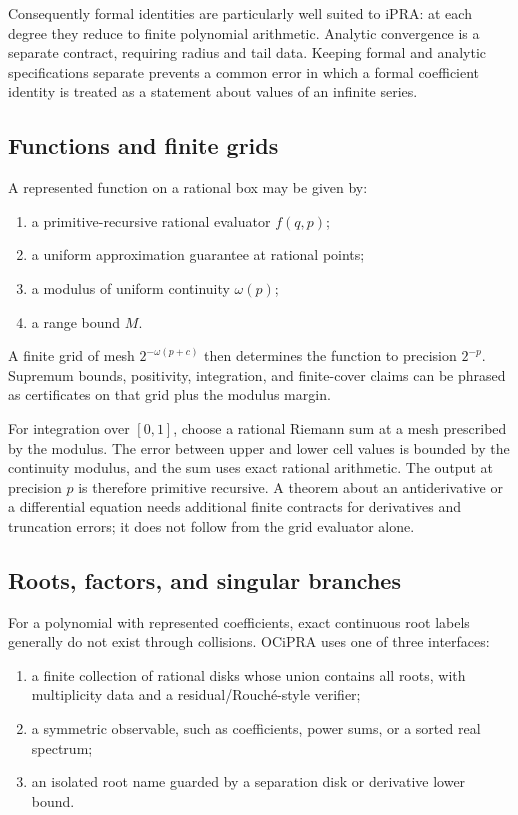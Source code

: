 Consequently formal identities are particularly well suited to iPRA: at each degree they reduce to finite polynomial arithmetic.  Analytic convergence is a separate contract, requiring radius and tail data.  Keeping formal and analytic specifications separate prevents a common error in which a formal coefficient identity is treated as a statement about values of an infinite series.

\subsection{Functions and finite grids}

A represented function on a rational box may be given by:

\begin{enumerate}
  \item a primitive-recursive rational evaluator $f(q,p)$;
  \item a uniform approximation guarantee at rational points;
  \item a modulus of uniform continuity $\omega(p)$;
  \item a range bound $M$.
\end{enumerate}

A finite grid of mesh $2^{-\omega(p+c)}$ then determines the function to precision $2^{-p}$.  Supremum bounds, positivity, integration, and finite-cover claims can be phrased as certificates on that grid plus the modulus margin.

For integration over $[0,1]$, choose a rational Riemann sum at a mesh prescribed by the modulus.  The error between upper and lower cell values is bounded by the continuity modulus, and the sum uses exact rational arithmetic.  The output at precision $p$ is therefore primitive recursive.  A theorem about an antiderivative or a differential equation needs additional finite contracts for derivatives and truncation errors; it does not follow from the grid evaluator alone.

\subsection{Roots, factors, and singular branches}

For a polynomial with represented coefficients, exact continuous root labels generally do not exist through collisions.  OCiPRA uses one of three interfaces:

\begin{enumerate}
  \item a finite collection of rational disks whose union contains all roots, with multiplicity data and a residual/Rouché-style verifier;
  \item a symmetric observable, such as coefficients, power sums, or a sorted real spectrum;
  \item an isolated root name guarded by a separation disk or derivative lower bound.
\end{enumerate}

